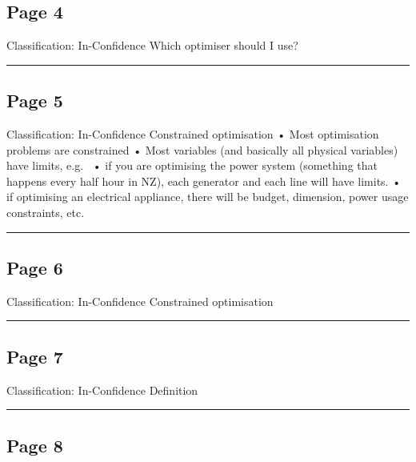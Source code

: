 \documentclass[
]{article}
\begin{document}
\subsection{Page 4}\label{page-4}

Classification: In-Confidence Which optimiser should I use?

\begin{center}\rule{0.5\linewidth}{0.5pt}\end{center}

\subsection{Page 5}\label{page-5}

Classification: In-Confidence Constrained optimisation • Most
optimisation problems are constrained • Most variables (and basically
all physical variables) have limits, e.g.~ • if you are optimising the
power system (something that happens every half hour in NZ), each
generator and each line will have limits. • if optimising an electrical
appliance, there will be budget, dimension, power usage constraints,
etc.

\begin{center}\rule{0.5\linewidth}{0.5pt}\end{center}

\subsection{Page 6}\label{page-6}

Classification: In-Confidence Constrained optimisation

\begin{center}\rule{0.5\linewidth}{0.5pt}\end{center}

\subsection{Page 7}\label{page-7}

Classification: In-Confidence Definition

\begin{center}\rule{0.5\linewidth}{0.5pt}\end{center}

\subsection{Page 8}\label{page-8}
\end{document}
